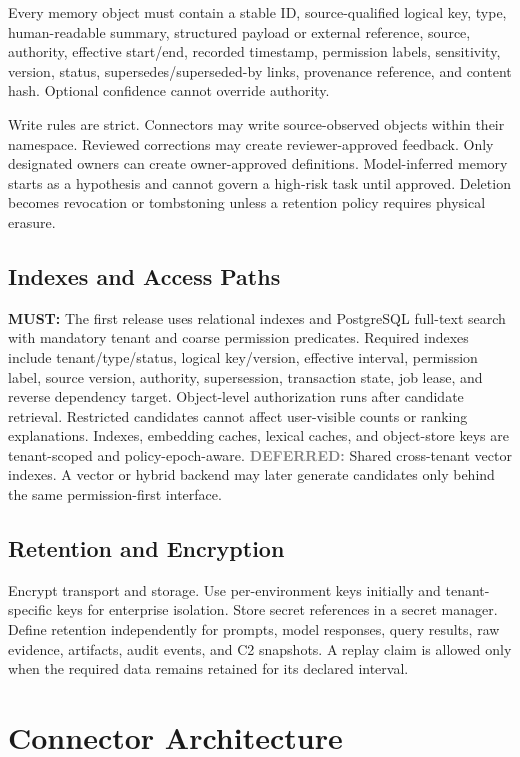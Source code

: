 \documentclass[10pt]{article}
\newcommand{\must}{\textbf{\textcolor{amosblue}{MUST:}}\xspace}
\newcommand{\deferred}{\textbf{\textcolor{gray}{DEFERRED:}}\xspace}
\begin{document}
Every memory object must contain a stable ID, source-qualified logical key, type, human-readable summary, structured payload or external reference, source, authority, effective start/end, recorded timestamp, permission labels, sensitivity, version, status, supersedes/superseded-by links, provenance reference, and content hash. Optional confidence cannot override authority.

Write rules are strict. Connectors may write source-observed objects within their namespace. Reviewed corrections may create reviewer-approved feedback. Only designated owners can create owner-approved definitions. Model-inferred memory starts as a hypothesis and cannot govern a high-risk task until approved. Deletion becomes revocation or tombstoning unless a retention policy requires physical erasure.

\subsection{Indexes and Access Paths}

\must The first release uses relational indexes and PostgreSQL full-text search with mandatory tenant and coarse permission predicates. Required indexes include tenant/type/status, logical key/version, effective interval, permission label, source version, authority, supersession, transaction state, job lease, and reverse dependency target. Object-level authorization runs after candidate retrieval. Restricted candidates cannot affect user-visible counts or ranking explanations. Indexes, embedding caches, lexical caches, and object-store keys are tenant-scoped and policy-epoch-aware. \deferred Shared cross-tenant vector indexes. A vector or hybrid backend may later generate candidates only behind the same permission-first interface.

\subsection{Retention and Encryption}

Encrypt transport and storage. Use per-environment keys initially and tenant-specific keys for enterprise isolation. Store secret references in a secret manager. Define retention independently for prompts, model responses, query results, raw evidence, artifacts, audit events, and C2 snapshots. A replay claim is allowed only when the required data remains retained for its declared interval.

\section{Connector Architecture}
\end{document}
